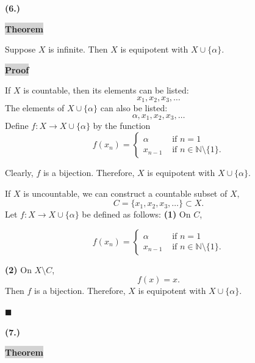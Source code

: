 \documentclass[12pt]{article}
\newcommand{\mybox}{%
    \collectbox{%
        \setlength{\fboxsep}{2pt}%
        \fbox{\BOXCONTENT}%
    }%
}
\begin{document}
\noindent \textbf{(6.)}

\vspace{3mm}

\noindent\mybox{\colorbox{lightgray}{\textbf{Theorem}}}\hspace{3mm}\hrulefill

\noindent Suppose $X$ is infinite. Then $X$ is equipotent with $X\cup\lbrace\alpha\rbrace$.

\vspace{5mm}

\noindent\mybox{\colorbox{lightgray}{\textbf{Proof}}}\hspace{3mm}\hrulefill

\noindent If $X$ is countable, then its elements can be listed: $$x_1, x_2, x_3, \ldots$$ The elements of $X\cup\lbrace \alpha \rbrace$ can also be listed:$$\alpha, x_1, x_2, x_3, \ldots$$ Define $f:X\longrightarrow X\cup\lbrace\alpha\rbrace$ by the function $$f(x_n) = \begin{cases}
\alpha & \text{ if } n=1 \\
x_{n-1} & \text{ if } n \in \mathbb{N}\setminus\lbrace 1 \rbrace.
\end{cases}
$$

\noindent Clearly, $f$ is a bijection. Therefore, $X$ is equipotent with $X\cup\lbrace\alpha\rbrace$.


\vspace{3mm}

\noindent If $X$ is uncountable, we can construct a countable subset of $X,$ $$C = \lbrace x_1, x_2, x_3, \ldots\rbrace \subset X.$$ Let $f:X\longrightarrow X\cup\lbrace \alpha \rbrace$ be defined as follows:  \textbf{(1)} On $C$,

$$f(x_n) = \begin{cases}
\alpha & \text{ if } n=1 \\
x_{n-1} & \text{ if } n \in \mathbb{N}\setminus\lbrace 1 \rbrace.
\end{cases}
$$

\noindent \textbf{(2)} On $X\setminus C$, $$f(x) = x.$$ Then $f$ is a bijection.  Therefore, $X$ is equipotent with $X\cup\lbrace\alpha\rbrace.$

\hfill$\blacksquare$

\pagebreak

\noindent \textbf{(7.)}

\vspace{3mm}

\noindent\mybox{\colorbox{lightgray}{\textbf{Theorem}}}\hspace{3mm}\hrulefill
\end{document}
